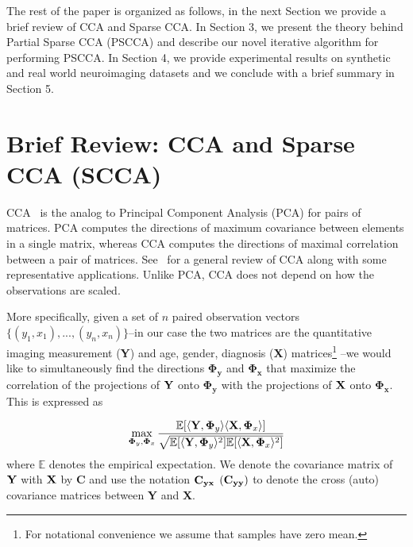 \documentclass{llncs}
\begin{document}
The rest of the paper is organized as follows, in the next Section we provide a brief review of CCA and Sparse CCA. In Section 3, we present the theory behind Partial Sparse CCA (PSCCA) and describe our novel iterative algorithm for performing PSCCA. In Section 4, we provide experimental results on synthetic and real world neuroimaging datasets and we conclude with a brief summary in Section 5.




\section{Brief Review: CCA and Sparse CCA (SCCA)}

CCA~\cite{hotellingcca} is the analog to Principal
Component Analysis (PCA) for pairs of matrices. PCA
computes the directions of maximum covariance between elements in a
single matrix, whereas CCA computes the directions of maximal correlation
between a pair of matrices. 
See~\cite{taylor:cca} for a general review of CCA along with some representative applications. 
Unlike PCA, CCA does not depend on how the observations
are scaled.  

More specifically, given a set of $n$ paired observation vectors
$\{(y_1,x_1),...,(y_n,x_n)\}$--in our case the two matrices are the
quantitative imaging measurement ({\bf Y}) and age, gender, diagnosis ({\bf X}) matrices\footnote{For
  notational convenience we assume that samples have zero mean.} --we would like to simultaneously find the directions
${\boldsymbol{\boldsymbol\Phi_y}}$ and
${\boldsymbol{\boldsymbol\Phi_x}}$ that maximize the correlation of
the projections of ${\bf Y}$ onto ${\boldsymbol{\boldsymbol\Phi_y}}$
with the projections of ${\bf X}$ onto
${\boldsymbol{\boldsymbol\Phi_x}}$. This is expressed as

\begin{equation}
\label{cca1}
\max_{{\boldsymbol\Phi_y}, {\boldsymbol\Phi_x}}
\frac{\mathbb{E}[\langle {\bf Y}, {\boldsymbol\Phi_y} \rangle \langle
    {\bf X},{\boldsymbol\Phi_x} \rangle]}{\sqrt{\mathbb{E}[\langle
      {\bf Y},{\boldsymbol\Phi_y} \rangle^2] \mathbb{E}[\langle {\bf
        X},{\boldsymbol\Phi_x} \rangle^2] }}
\end{equation}
where $\mathbb{E}$ denotes the empirical expectation. We denote the
covariance matrix of ${\bf Y}$ with ${\bf X}$ by {\bf C} and use the
notation ${\bf C_{yx}}$ ${(\bf C_{yy})}$ to denote the cross (auto)
covariance matrices between {\bf Y} and {\bf X}. 
\end{document}
